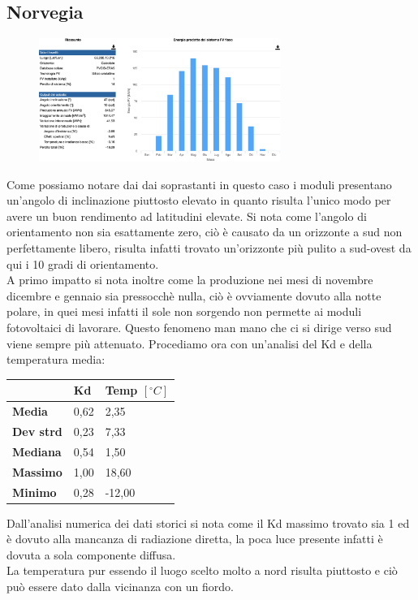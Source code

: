 \subsection{Norvegia}
\begin{figure}[H]
    \centering
    \includegraphics[width=0.7\textwidth]{res/cap 5/impianto norvegia}
\end{figure}\noindent
Come possiamo notare dai dai soprastanti in questo caso i moduli presentano un'angolo di inclinazione piuttosto elevato in quanto risulta l'unico modo per avere un buon rendimento ad latitudini elevate. Si nota come l'angolo di orientamento non sia esattamente zero, ciò è causato da un orizzonte a sud non perfettamente libero, risulta infatti trovato un'orizzonte più pulito a sud-ovest da qui i 10 gradi di orientamento.\\
A primo impatto si nota inoltre come la produzione nei mesi di novembre dicembre e gennaio sia pressocchè nulla, ciò è ovviamente dovuto alla notte polare, in quei mesi infatti il sole non sorgendo non permette ai moduli fotovoltaici di lavorare. Questo fenomeno man mano che ci si dirige verso sud viene sempre più attenuato.
Procediamo ora con un'analisi del Kd e della temperatura media:
\begin{table}[H]
    \centering
    \begin{tabular}{|l|l|l|}
    \hline
         & \textbf{Kd} & \textbf{Temp $[{}^\circ C]$} \\ \hline
        \textbf{Media} & 0,62 & 2,35 \\ \hline
        \textbf{Dev strd} & 0,23 & 7,33 \\ \hline
        \textbf{Mediana} & 0,54 & 1,50 \\ \hline
        \textbf{Massimo} & 1,00 & 18,60 \\ \hline
        \textbf{Minimo}  & 0,28 & -12,00 \\ \hline
    \end{tabular}
\end{table}\noindent
Dall'analisi numerica dei dati storici si nota come il Kd massimo trovato sia 1 ed è dovuto alla mancanza di radiazione diretta, la poca luce presente infatti è dovuta a sola componente diffusa.\\
La temperatura pur essendo il luogo scelto molto a nord risulta piuttosto e ciò può essere dato dalla vicinanza con un fiordo.
\vfill\newpage
